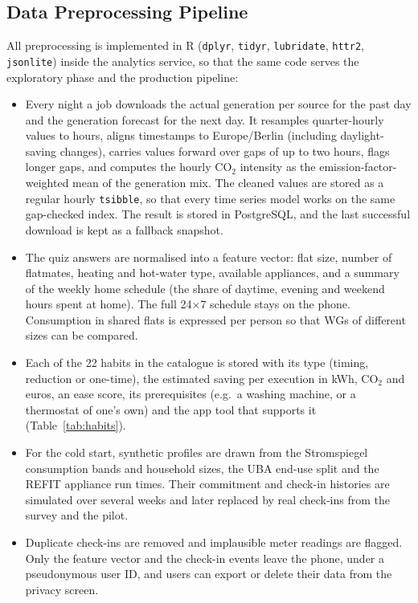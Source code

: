 \documentclass[conference]{IEEEtran}
\newcommand{\COtwo}{CO$_2$}
\newcommand{\pkg}[1]{\texttt{#1}}
\begin{document}
\subsection{Data Preprocessing Pipeline}
All preprocessing is implemented in R (\pkg{dplyr}, \pkg{tidyr}, \pkg{lubridate}, \pkg{httr2}, \pkg{jsonlite}) inside the analytics service, so that the same code serves the exploratory phase and the production pipeline:
\begin{itemize}
\item Every night a job downloads the actual generation per source for the past day and the generation forecast for the next day. It resamples quarter-hourly values to hours, aligns timestamps to Europe/Berlin (including daylight-saving changes), carries values forward over gaps of up to two hours, flags longer gaps, and computes the hourly \COtwo{} intensity as the emission-factor-weighted mean of the generation mix. The cleaned values are stored as a regular hourly \pkg{tsibble}, so that every time series model works on the same gap-checked index. The result is stored in PostgreSQL, and the last successful download is kept as a fallback snapshot.
\item The quiz answers are normalised into a feature vector: flat size, number of flatmates, heating and hot-water type, available appliances, and a summary of the weekly home schedule (the share of daytime, evening and weekend hours spent at home). The full 24$\times$7 schedule stays on the phone. Consumption in shared flats is expressed per person so that WGs of different sizes can be compared.
\item Each of the 22 habits in the catalogue is stored with its type (timing, reduction or one-time), the estimated saving per execution in kWh, \COtwo{} and euros, an ease score, its prerequisites (e.g.\ a washing machine, or a thermostat of one's own) and the app tool that supports it (Table~\ref{tab:habits}).
\item For the cold start, synthetic profiles are drawn from the Stromspiegel consumption bands and household sizes, the UBA end-use split and the REFIT appliance run times. Their commitment and check-in histories are simulated over several weeks and later replaced by real check-ins from the survey and the pilot.
\item Duplicate check-ins are removed and implausible meter readings are flagged. Only the feature vector and the check-in events leave the phone, under a pseudonymous user ID, and users can export or delete their data from the privacy screen.
\end{itemize}
\end{document}
